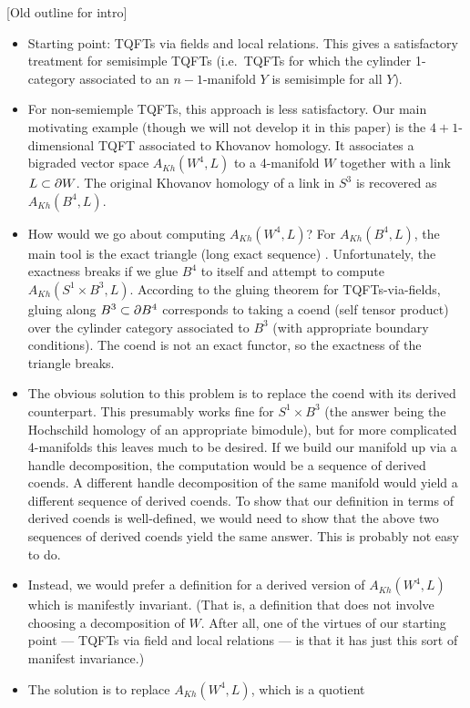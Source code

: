 [Old outline for intro]
\begin{itemize}
\item Starting point: TQFTs via fields and local relations.
This gives a satisfactory treatment for semisimple TQFTs
(i.e.\ TQFTs for which the cylinder 1-category associated to an
$n{-}1$-manifold $Y$ is semisimple for all $Y$).
\item For non-semiemple TQFTs, this approach is less satisfactory.
Our main motivating example (though we will not develop it in this paper)
is the $4{+}1$-dimensional TQFT associated to Khovanov homology.
It associates a bigraded vector space $A_{Kh}(W^4, L)$ to a 4-manifold $W$ together
with a link $L \subset \partial W$.
The original Khovanov homology of a link in $S^3$ is recovered as $A_{Kh}(B^4, L)$.
\item How would we go about computing $A_{Kh}(W^4, L)$?
For $A_{Kh}(B^4, L)$, the main tool is the exact triangle (long exact sequence)
.
Unfortunately, the exactness breaks if we glue $B^4$ to itself and attempt
to compute $A_{Kh}(S^1\times B^3, L)$.
According to the gluing theorem for TQFTs-via-fields, gluing along $B^3 \subset \partial B^4$
corresponds to taking a coend (self tensor product) over the cylinder category
associated to $B^3$ (with appropriate boundary conditions).
The coend is not an exact functor, so the exactness of the triangle breaks.
\item The obvious solution to this problem is to replace the coend with its derived counterpart.
This presumably works fine for $S^1\times B^3$ (the answer being the Hochschild homology
of an appropriate bimodule), but for more complicated 4-manifolds this leaves much to be desired.
If we build our manifold up via a handle decomposition, the computation
would be a sequence of derived coends.
A different handle decomposition of the same manifold would yield a different
sequence of derived coends.
To show that our definition in terms of derived coends is well-defined, we
would need to show that the above two sequences of derived coends yield the same answer.
This is probably not easy to do.
\item Instead, we would prefer a definition for a derived version of $A_{Kh}(W^4, L)$
which is manifestly invariant.
(That is, a definition that does not
involve choosing a decomposition of $W$.
After all, one of the virtues of our starting point --- TQFTs via field and local relations ---
is that it has just this sort of manifest invariance.)
\item The solution is to replace $A_{Kh}(W^4, L)$, which is a quotient

\end{itemize}
